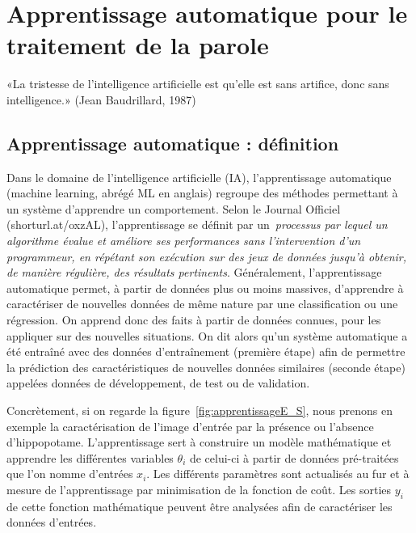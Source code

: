\chapter{Apprentissage automatique pour le traitement de la parole}
«La tristesse de l'intelligence artificielle est qu'elle est sans artifice, donc sans intelligence.»  (Jean Baudrillard, 1987)

\section{Apprentissage automatique : définition}

Dans le domaine de l'intelligence artificielle (IA), l'apprentissage automatique (machine learning, abrégé ML en anglais) regroupe des méthodes permettant à un système d'apprendre un comportement. Selon le Journal Officiel (shorturl.at/oxzAL), l'apprentissage se définit par un~\textit{processus par lequel un algorithme évalue et améliore ses performances sans l'intervention d'un programmeur, en répétant son exécution sur des jeux de données jusqu'à obtenir, de manière régulière, des résultats pertinents}. Généralement, l'apprentissage automatique permet, à partir de données plus ou moins massives, d'apprendre à caractériser de nouvelles données de même nature par une classification ou une régression. On apprend donc des faits à partir de données connues, pour les appliquer sur des nouvelles situations. On dit alors qu'un système automatique a été entraîné avec des données d’entraînement (première étape) afin de permettre la prédiction des caractéristiques de nouvelles données similaires (seconde étape) appelées données de développement, de test ou de validation.



Concrètement, si on regarde la figure~\ref{fig:apprentissageE_S}, nous prenons en exemple la caractérisation de l'image d'entrée par la présence ou l'absence d'hippopotame. L'apprentissage sert à construire un modèle mathématique et apprendre les différentes variables $\theta_i$ de celui-ci à partir de données pré-traitées que l'on nomme d'entrées $x_i$. Les différents paramètres sont actualisés au fur et à mesure de l'apprentissage par minimisation de la fonction de coût. Les sorties $y_i$ de cette fonction mathématique peuvent être analysées afin de caractériser les données d'entrées.

